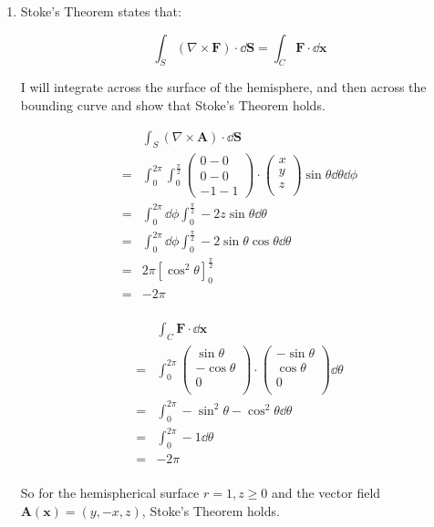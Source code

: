 \documentclass[10pt,\jkfside,a4paper]{article}
\begin{document}
\begin{enumerate}
\item 

Stoke's Theorem states that:

\[
\int_S (\nabla \times \mathbf{F}) \cdot \dd{\mathbf{S}} = \int_C \mathbf{F} \cdot \dd{\mathbf{x}}
\]

I will integrate across the surface of the hemisphere, and then across the bounding curve and 
show that Stoke's Theorem holds.

\[
\begin{split}
 & \int_S (\nabla \times \mathbf{A}) \cdot \dd{\mathbf{S}} \\
=& \int^{2\pi}_{0}\int^{\frac{\pi}{2}}_0 \begin{pmatrix} 0 - 0 \\ 0 - 0 \\ -1 - 1 \end{pmatrix} \cdot \begin{pmatrix} x \\ y \\ z \\ \end{pmatrix} \sin\theta \dd{\theta}\dd{\phi} \\
=& \int^{2\pi}_{0}\dd{\phi}\int^{\frac{\pi}{2}}_0 -2z \sin\theta \dd{\theta} \\
=& \int^{2\pi}_{0}\dd{\phi}\int^{\frac{\pi}{2}}_0 -2 \sin\theta\cos\theta \dd{\theta} \\
=& 2\pi\left[\cos^2\theta\right]^{\frac{\pi}{2}}_0 \\
=& -2\pi \\
\end{split}
\]

\[
\begin{split}
 & \int_C \mathbf{F} \cdot \dd{\mathbf{x}} \\
=& \int^{2\pi}_0\begin{pmatrix} \sin\theta \\ -\cos\theta \\ 0 \\ \end{pmatrix} \cdot \begin{pmatrix} -\sin\theta \\ \cos\theta \\ 0 \\ \end{pmatrix} \dd{\theta} \\
=& \int^{2\pi}_0 -\sin^2\theta - \cos^2\theta \dd{\theta} \\
=& \int^{2\pi}_0 -1 \dd{\theta} \\
=& -2\pi \\
\end{split}
\]

So for the hemispherical surface $r = 1, z \geq 0$ and the vector field $\mathbf{A}(\mathbf{x}) = (y, -x, z)$, 
Stoke's Theorem holds.

\end{enumerate}
\end{document}
